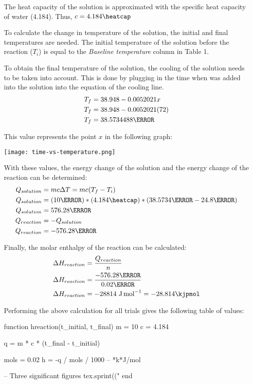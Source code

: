 \documentclass[demo, 12pt, notitlepage, letterpaper]{report}
\begin{document}
The heat capacity of the solution is approximated with the specific heat capacity of water (4.184\heatcap). Thus, $c = 4.184\heatcap$

To calculate the change in temperature of the solution, the initial and final temperatures are needed. The initial temperature of the solution before the reaction ($T_i$) is equal to the \textit{Baseline temperature} column in Table 1.

To obtain the final temperature of the solution, the cooling of the solution needs to be taken into account. This is done by plugging in the time when  was added into the solution into the equation of the cooling line.
\begin{align*}
	T_f & = 38.948 - 0.0052021x    \\
	T_f & = 38.948 - 0.0052021(72) \\
	T_f & = 38.5734488\celsius
\end{align*}

This value represents the point $x$ in the following graph:

\centerline{\noindent\texttt{[image: time-vs-temperature.png]}}


With these values, the energy change of the solution and the energy change of the reaction can be determined:
\begin{align*}
	Q_{solution} & = mc\Delta T = mc(T_f - T_i)
	\\
	Q_{solution} & = (10\gram) * (4.184\heatcap) * (38.5734\celsius - 24.8\celsius)
	\\
	Q_{solution} & = 576.28\joule
	\\
	Q_{reaction} & = -Q_{solution}
	\\
	Q_{reaction} & = -576.28\joule
\end{align*}

Finally, the molar enthalpy of the reaction can be calculated:
\begin{align*}
	\Delta H_{reaction} & = \frac{Q_{reaction}}{n}                        \\
	\Delta H_{reaction} & = \frac{-576.28\joule}{0.02\mol}                \\
	\Delta H_{reaction} & = -28814~\unit{\joule\per\mol} = -28.814\kjpmol
\end{align*}

Performing the above calculation for all trials gives the following table of values:

\begin{luacode*}
function hreaction(t_initial, t_final)
	m = 10
	c = 4.184

	q = m * c * (t_final - t_initial)

	mols = 0.02
	h = -q / mols / 1000 -- *k*J/mol

	-- Three significant figures
	tex.sprint(("%
end
\end{luacode*}
\end{document}
